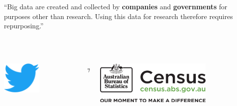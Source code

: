 \documentclass[serif, aspectratio=169]{beamer}
\begin{document}
\begin{frame}

\enquote{Big data are created and collected by \textbf{companies} and \textbf{governments} for purposes other than research. Using this data for research therefore requires repurposing.} \autocite[14]{salganik_bit_2018}\\~\ \\~\
\begin{columns}
\begin{column}{0.4\textwidth}
\centering\includegraphics[width=0.5\textwidth]{figure/300px-Twitter_bird_logo_2012}
\end{column}

\begin{column}{0.2\textwidth}
\LARGE\centering$\neq$
\end{column}

\begin{column}{0.4\textwidth}
\centering\includegraphics[width=0.7\textwidth]{figure/640px-ABS_Census_Logo}
\end{column}

\end{columns}

\end{frame}
\end{document}
